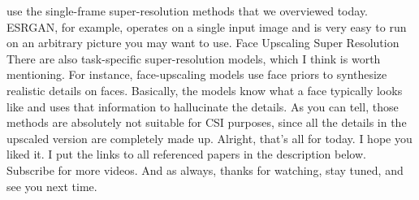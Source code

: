use the single-frame super-resolution methods that we overviewed today.
ESRGAN, for example, operates on a single input image and is very easy to run on an
arbitrary picture you may want to use.
Face Upscaling Super Resolution
There are also task-specific super-resolution models, which I think is worth mentioning.
For instance, face-upscaling models use face priors to synthesize realistic details on
faces.
Basically, the models know what a face typically looks like and uses that information to hallucinate
the details.
As you can tell, those methods are absolutely not suitable for CSI purposes, since all the
details in the upscaled version are completely made up.
Alright, that's all for today.
I hope you liked it.
I put the links to all referenced papers in the description below.
Subscribe for more videos.
And as always, thanks for watching, stay tuned, and see you next time.